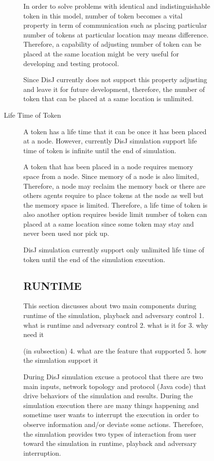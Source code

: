 \begin{description}
\begin{description}
\begin{description}
In order to solve problems with identical and indistinguishable token in this model, number of token becomes a vital property in term of communication such as placing particular number of tokens at particular location may means difference. Therefore, a capability of adjusting number of token can be placed at the same location might be very useful for developing and testing protocol.

Since DisJ currently does not support this property adjusting and leave it for future development, therefore, the number of token that can be placed at a same location is unlimited.

\item[Life Time of Token]
A token has a life time that it can be once it has been placed at a node. However, currently DisJ simulation support life time of token is infinite until the end of simulation.

A token that has been placed in a node requires memory space from a node. Since memory of a node is also limited, Therefore, a node may reclaim the memory back or there are others agents require to place tokens at the node as well but the memory space is limited. Therefore, a life time of token is also another option requires beside limit number of token can placed at a same location since some token may stay and never been used nor pick up.

DisJ simulation currently support only unlimited life time of token until the end of the simulation execution.




\subsection{RUNTIME}
This section discusses about two main components during runtime of the simulation, playback and adversary control
1. what is runtime and adversary control
2. what is it for
3. why need it

(in subsection)
4. what are the feature that supported
5. how the simulation support it

During DisJ simulation excuse a protocol that there are two main inputs, network topology and protocol (Java code) that drive behaviors of the simulation and results. During the simulation execution there are many things happening and sometime user wants to interrupt the execution in order to observe information and/or deviate some actions. Therefore, the simulation provides two types of interaction from user toward the simulation in runtime, playback and adversary interruption.


\end{description}
\end{description}
\end{description}
